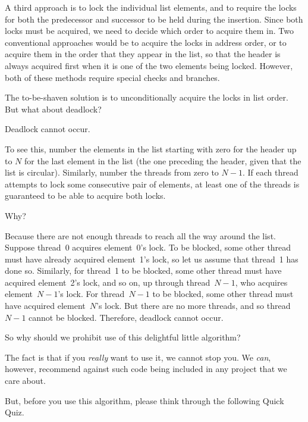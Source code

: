 A third approach is to lock the individual list elements, and to require
the locks for both the predecessor and successor to be held during the
insertion.
Since both locks must be acquired, we need to decide which order to
acquire them in.
Two conventional approaches would be to acquire the locks in address
order, or to acquire them in the order that they appear in the list,
so that the header is always acquired first when it is one of the two
elements being locked.
However, both of these methods require special checks and branches.

The to-be-shaven solution is to unconditionally acquire the locks in
list order.
But what about deadlock?

Deadlock cannot occur.

To see this, number the elements in the list starting with zero for the
header up to $N$ for the last element in the list (the one preceding the
header, given that the list is circular).
Similarly, number the threads from zero to $N-1$.
If each thread attempts to lock some consecutive pair of elements,
at least one of the threads is guaranteed to be able to acquire both
locks.

Why?

Because there are not enough threads to reach all the way around the list.
Suppose thread~0 acquires element~0's lock.
To be blocked, some other thread must have already acquired element~1's
lock, so let us assume that thread~1 has done so.
Similarly, for thread~1 to be blocked, some other thread must have acquired
element~2's lock, and so on, up through thread~$N-1$, who acquires
element~$N-1$'s lock.
For thread~$N-1$ to be blocked, some other thread must have acquired
element~$N$'s lock.
But there are no more threads, and so thread~$N-1$ cannot be blocked.
Therefore, deadlock cannot occur.

So why should we prohibit use of this delightful little algorithm?

The fact is that if you \emph{really} want to use it, we cannot stop you.
We \emph{can}, however, recommend against such code being included
in any project that we care about.

But, before you use this algorithm, please think through the following
Quick Quiz.

\QuickQuizEnd


